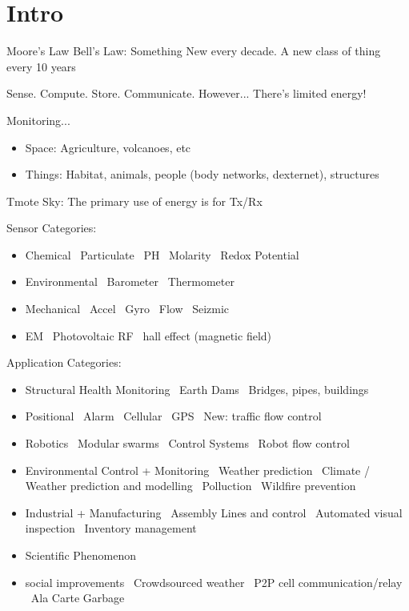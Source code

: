 \documentclass[11pt]{article}
\begin{document}
\section{Intro}
    Moore's Law
    Bell's Law: Something New every decade. A new class of thing every 10 years

    Sense. Compute. Store. Communicate. However... There's limited energy!

    Monitoring...
    \begin{itemize}
        \item Space: Agriculture, volcanoes, etc
        \item Things: Habitat, animals, people (body networks, dexternet), structures
    \end{itemize}

    Tmote Sky: The primary use of energy is for Tx/Rx

    Sensor Categories:
    \begin{itemize}
        \item Chemical \
            Particulate \
            PH \
            Molarity \
            Redox Potential
        \item Environmental \
            Barometer \
            Thermometer
        \item Mechanical \
            Accel \
            Gyro \
            Flow \
            Seizmic
        \item EM \
            Photovoltaic
            RF \
            hall effect (magnetic field)
    \end{itemize}

    Application Categories:
    \begin{itemize}
        \item Structural Health Monitoring \
            Earth Dams \
            Bridges, pipes, buildings
        \item Positional \
            Alarm \
            Cellular \
            GPS \
            New: traffic flow control
        \item Robotics \
            Modular swarms \
            Control Systems \
            Robot flow control
        \item Environmental Control + Monitoring \
            Weather prediction \
            Climate / Weather prediction and modelling \
            Polluction \
            Wildfire prevention
        \item Industrial + Manufacturing \
            Assembly Lines and control \
            Automated visual inspection \
            Inventory management
        \item Scientific Phenomenon
        \item social improvements \
            Crowdsourced weather \
            P2P cell communication/relay \
            Ala Carte Garbage
    \end{itemize}
\end{document}
